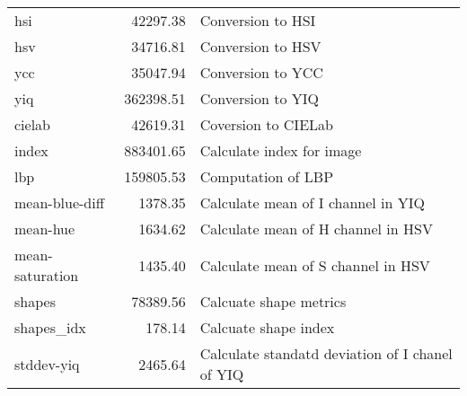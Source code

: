 \begin{longtable}{lrl}
hsi             &   42297.38 & Conversion to HSI\\
hsv             &   34716.81 & Conversion to HSV\\
ycc             &   35047.94 & Conversion to YCC\\
yiq             &  362398.51 & Conversion to YIQ\\
cielab          &   42619.31 & Coversion to CIELab\\
index           &  883401.65 & Calculate index for image\\
lbp             &  159805.53 & Computation of LBP\\
mean-blue-diff  &    1378.35 & Calculate mean of I channel in YIQ\\
mean-hue        &    1634.62 & Calculate mean of H channel in HSV\\
mean-saturation &    1435.40 & Calculate mean of S channel in HSV\\
shapes      &     78389.56 & Calcuate shape metrics\\
shapes\_idx      &     178.14 & Calcuate shape index\\
stddev-yiq      &    2465.64 & Calculate standatd deviation of I chanel of YIQ\\
\end{longtable}
